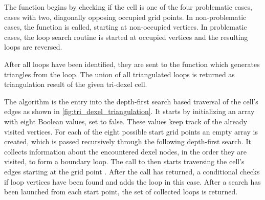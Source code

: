%
The  function begins by checking if the cell is one of the four problematic cases, \ie cases with two, diagonally opposing occupied grid points.
In non-problematic cases, the  function is called, starting at non-occupied vertices.
In problematic cases, the loop search routine is started at occupied vertices and the resulting loops are reversed.

After all loops have been identified, they are sent to the  function which generates triangles from the loop.
The union of all triangulated loops is returned as triangulation result of the given tri-dexel cell.

The  algorithm is the entry into the depth-first search based traversal of the cell's edges as shown in \cref{fig:tri_dexel_triangulation}.
It starts by initializing an array with eight Boolean values, set to false.
These values keep track of the already visited vertices.
For each of the eight possible start grid points an empty array  is created, which is passed recursively through the following depth-first search.
It collects information about the encountered dexel nodes, in the order they are visited, to form a boundary loop.
The call to  then starts traversing the cell's edges starting at the grid point .
After the call has returned, a conditional checks if loop vertices have been found and adds the loop in this case.
After a search has been launched from each start point, the set of collected loops is returned.

